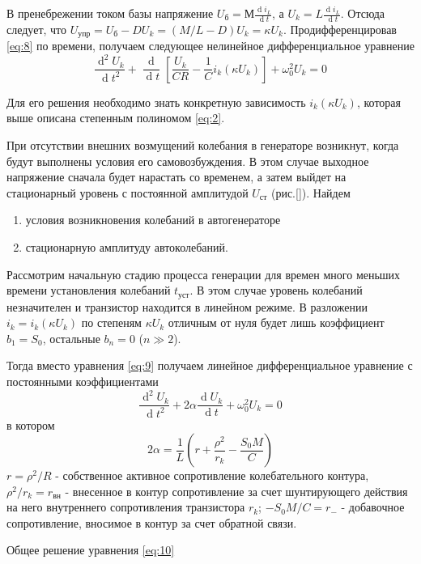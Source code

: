 В пренебрежении током базы напряжение $\displaystyle U_\text{б}=М\frac{\operatorname di_L}{\operatorname dt}$, а $\displaystyle U_k=L\frac{\operatorname di_L}{\operatorname dt}$. Отсюда следует, что $U_\text{упр}=U_\text{б}-DU_k=(M/L-D)U_k=\kappa U_k$. Продифференцировав \eqref{eq:8} по времени, получаем следующее нелинейное дифференциальное уравнение
\begin{equation}
\frac{\operatorname d^2U_k}{\operatorname dt^2}+\frac{\operatorname d}{\operatorname dt}[\frac{U_k}{CR}-\frac{1}{C}i_k(\kappa U_k)]+\omega_0^2U_k=0
\label{eq:9}
\end{equation}

Для его решения необходимо знать конкретную зависимость $i_k(\kappa U_k)$, которая выше описана степенным полиномом \eqref{eq:2}. 

При отсутствии внешних возмущений колебания в генераторе возникнут, когда будут выполнены условия его самовозбуждения. В этом случае выходное напряжение сначала будет нарастать со временем, а
затем выйдет на стационарный уровень с постоянной амплитудой $U_\text{ст}$ (рис.\ref{}). Найдем
\begin{enumerate}
\item условия возникновения колебаний в автогенераторе
\item стационарную амплитуду автоколебаний.
\end{enumerate}

Рассмотрим начальную стадию процесса генерации для времен много меньших времени установления колебаний $t_\text{уст}$. В этом случае уровень колебаний незначителен и транзистор находится в линейном режиме. В разложении $i_k=i_k(\kappa U_k)$ по степеням $\kappa U_k$ отличным от нуля будет лишь коэффициент $b_1=S_0$, остальные $b_n=0$ ($n\gg2$).

Тогда вместо уравнения \eqref{eq:9} получаем линейное дифференциальное уравнение с постоянными коэффициентами
\begin{equation}
\frac{\operatorname d^2U_k}{\operatorname dt^2}+2\alpha \frac{\operatorname d U_k}{\operatorname dt}+\omega_0^2U_k=0
\label{eq:10}
\end{equation}
в котором
\begin{equation}
2\alpha=\frac{1}{L}(r+\frac{\rho^2}{r_k}-\frac{S_0M}{C})
\label{eq:11}
\end{equation}
$\displaystyle r=\rho^2/R$ - собственное активное сопротивление колебательного контура, $\displaystyle \rho^2/r_k=r_\text{вн}$ - внесенное в контур сопротивление за счет шунтирующего действия на него внутреннего сопротивления транзистора $r_k$; $-S_0M/C=r_{-}$ - добавочное сопротивление, вносимое в контур за счет обратной связи. 

Общее решение уравнения \eqref{eq:10}

